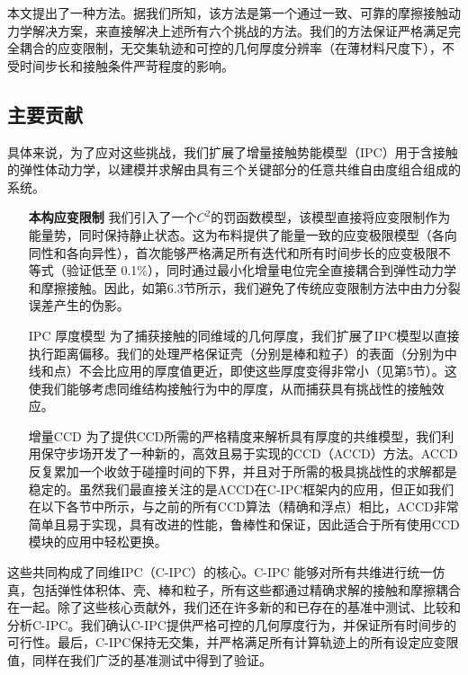 本文提出了一种方法。据我们所知，该方法是第一个通过一致、可靠的摩擦接触动力学解决方案，来直接解决上述所有六个挑战的方法。我们的方法保证严格满足完全耦合的应变限制，无交集轨迹和可控的几何厚度分辨率（在薄材料尺度下），不受时间步长和接触条件严苛程度的影响。

\subsection{主要贡献}

具体来说，为了应对这些挑战，我们扩展了增量接触势能模型（IPC）用于含接触的弹性体动力学，以建模并求解由具有三个关键部分的任意共维自由度组合组成的系统。

\begin{itemize}
\item[\textbf{本构应变限制}]我们引入了一个$C^2$的罚函数模型，该模型直接将应变限制作为能量势，同时保持静止状态。这为布料提供了能量一致的应变极限模型（各向同性和各向异性），首次能够严格满足所有迭代和所有时间步长的应变极限不等式（验证低至 0.1\%），同时通过最小化增量电位完全直接耦合到弹性动力学和摩擦接触。因此，如第6.3节所示，我们避免了传统应变限制方法中由力分裂误差产生的伪影。
  \item [IPC 厚度模型] 为了捕获接触的同维域的几何厚度，我们扩展了IPC模型以直接执行距离偏移。我们的处理严格保证壳（分别是棒和粒子）的表面（分别为中线和点）不会比应用的厚度值更近，即使这些厚度变得非常小（见第5节）。这使我们能够考虑同维结构接触行为中的厚度，从而捕获具有挑战性的接触效应。
  \item [增量CCD] 为了提供CCD所需的严格精度来解析具有厚度的共维模型，我们利用保守步场开发了一种新的，高效且易于实现的CCD（ACCD）方法。ACCD反复累加一个收敛于碰撞时间的下界，并且对于所需的极具挑战性的求解都是稳定的。虽然我们最直接关注的是ACCD在C-IPC框架内的应用，但正如我们在以下各节中所示，与之前的所有CCD算法（精确和浮点）相比，ACCD非常简单且易于实现，具有改进的性能，鲁棒性和保证，因此适合于所有使用CCD模块的应用中轻松更换。
\end{itemize}

这些共同构成了同维IPC（C-IPC）的核心。C-IPC 能够对所有共维进行统一仿真，包括弹性体积体、壳、棒和粒子，所有这些都通过精确求解的接触和摩擦耦合在一起。除了这些核心贡献外，我们还在许多新的和已存在的基准中测试、比较和分析C-IPC。我们确认C-IPC提供严格可控的几何厚度行为，并保证所有时间步的可行性。最后，C-IPC保持无交集，并严格满足所有计算轨迹上的所有设定应变限值，同样在我们广泛的基准测试中得到了验证。






